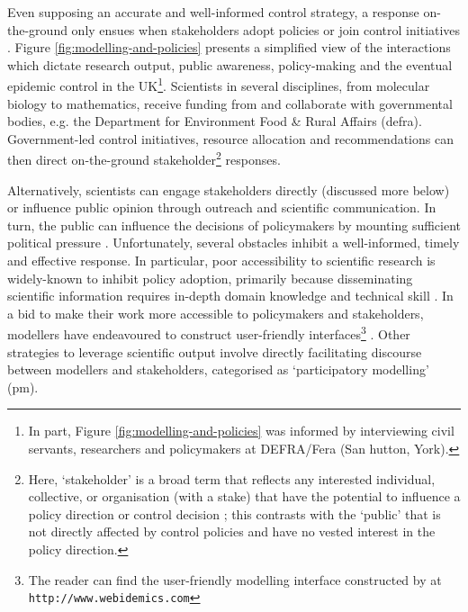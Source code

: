 Even supposing an accurate and well-informed control strategy,
a response on-the-ground only ensues when stakeholders adopt policies or join control initiatives \cite{reed2018theory}.
Figure \ref{fig:modelling-and-policies} presents a simplified view of the interactions which dictate research output, public awareness, 
policy-making and the eventual epidemic control in the UK\footnote{
In part, Figure \ref{fig:modelling-and-policies} was informed by interviewing civil servants, researchers and policymakers at DEFRA/Fera (San hutton, York).}. Scientists in several disciplines,
from molecular biology to mathematics, receive funding from and collaborate with governmental
bodies, e.g. the Department for Environment Food \& Rural Affairs (\acrshort{defra}). Government-led control initiatives, resource
allocation and recommendations can then direct on-the-ground stakeholder\footnote{Here, `stakeholder' is a broad
term that reflects any interested individual, collective, or organisation 
(with a stake) that have the potential to influence a policy direction or control decision
\cite{brugha2000stakeholder}; this contrasts with the `public' that is not directly affected by control policies and have no vested interest in the policy direction.} 
responses. 

Alternatively, scientists can engage stakeholders directly (discussed more below) or influence public opinion through outreach and
scientific communication. In turn, the public can influence the decisions of policymakers by
mounting sufficient political pressure \cite{fuller2016public}.
Unfortunately, several obstacles inhibit a well-informed, timely and effective response. 
In particular, poor accessibility to scientific research is widely-known to inhibit policy adoption, 
primarily because disseminating scientific information requires in-depth domain knowledge and technical skill \cite{jones2020modelling}.
In a bid to make their work more accessible to policymakers and stakeholders, modellers have endeavoured to construct user-friendly interfaces\footnote{
The reader can find the user-friendly modelling interface constructed by \cite{WEBIDEMICS} at \nolinkurl{http://www.webidemics.com}} \cite{WEBIDEMICS}.
Other strategies to leverage scientific output involve directly facilitating discourse between modellers and stakeholders, categorised as `participatory modelling' (\acrshort{pm}).


